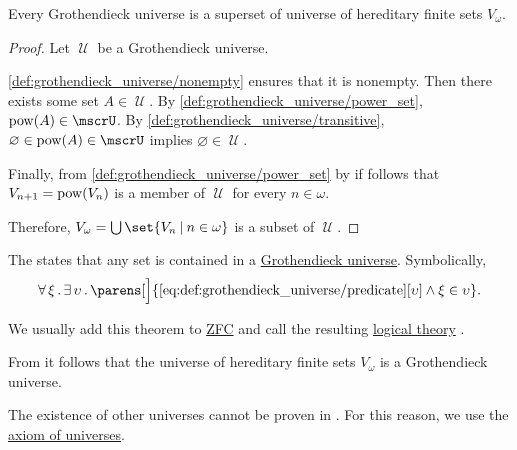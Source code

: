 \begin{lemma}\label{thm:grothendieck_universe_contains_finite_sets}
  Every Grothendieck universe is a superset of universe of hereditary finite sets \hyperref[def:universe_of_hereditary_finite_sets]{\( V_\omega \)}.
\end{lemma}
\begin{proof}
  Let \( \mscrU \) be a Grothendieck universe.

  \ref{def:grothendieck_universe/nonempty} ensures that it is nonempty. Then there exists some set \( A \in \mscrU \). By \ref{def:grothendieck_universe/power_set}, \( \pow(A) \in \mscrU \). By \ref{def:grothendieck_universe/transitive}, \( \varnothing \in \pow(A) \in \mscrU \) implies \( \varnothing \in \mscrU \).

  Finally, from \ref{def:grothendieck_universe/power_set} by  if follows that \( V_{n+1} = \operatorname{pow}(V_n) \) is a member of \( \mscrU \) for every \( n \in \omega \).

  Therefore, \( V_\omega = \bigcup \set{ V_n \given n \in \omega } \) is a subset of \( \mscrU \).
\end{proof}

\begin{definition}\label{def:axiom_of_universes}
  The  states that any set is contained in a \hyperref[def:grothendieck_universe]{Grothendieck universe}. Symbolically,
  \begin{equation}\label{eq:def:axiom_of_universes}
    \begin{aligned}
      \qforall \xi \qexists \upsilon \parens[\Big]{ \ref{eq:def:grothendieck_universe/predicate}[\upsilon] \wedge \xi \in \upsilon }.
    \end{aligned}
  \end{equation}

  We usually add this theorem to \hyperref[def:zfc]{ZFC} and call the resulting \hyperref[def:first_order_theory]{logical theory} .
\end{definition}

\begin{example}\label{ex:def:axiom_of_universes}
  From  it follows that the universe of hereditary finite sets \hyperref[def:universe_of_hereditary_finite_sets]{\( V_\omega \)} is a Grothendieck universe.

  The existence of other universes cannot be proven in . For this reason, we use the \hyperref[def:axiom_of_universes]{axiom of universes}.
\end{example}

